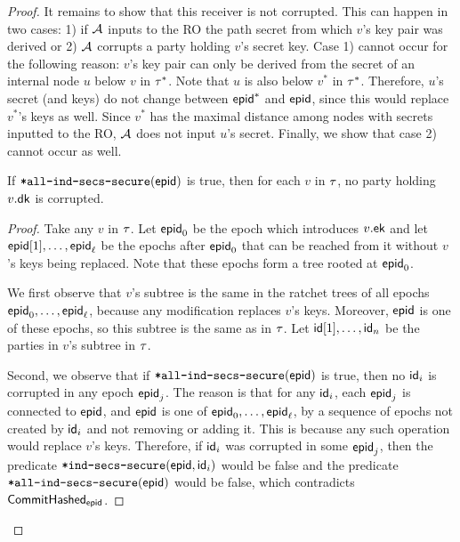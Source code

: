 \begin{proof}
It remains to show that this receiver is not corrupted. This can happen in two cases: 1) if $\mathcal{A}_{\relax}$ inputs to the RO the path secret from which $v$'s key pair was derived or 2) $\mathcal{A}_{\relax}$ corrupts a party holding $v$'s secret key. Case 1) cannot occur for the following reason: $v$'s key pair can only be derived from the secret of an internal node $u$ below $v$ in $\tau^*$. Note that $u$ is also below $v^*$ in $\tau^*$. Therefore, $u$'s secret (and keys) do not change between ${\normalfont\textsf{epid}}^*$ and ${\normalfont\textsf{epid}}$, since this would replace $v^*$'s keys as well. Since $v^*$ has the maximal distance among nodes with secrets inputted to the RO, $\mathcal{A}_{\relax}$ does not input $u$'s secret.
Finally, we show that case 2) cannot occur as well.
\begin{lemma}
  If ${\textnormal{\tt*all-ind-secs-secure}}({\normalfont\textsf{epid}})$ is true, then for each $v$ in $\tau$, no party holding $v.{\mathsf{dk}}$ is corrupted.
\end{lemma}
\begin{proof}
  Take any $v$ in $\tau$. Let ${\normalfont\textsf{epid}}_0$ be the epoch which introduces $v.{\mathsf{ek}}$ and let ${\normalfont\textsf{epid}}[1], \dots, {\normalfont\textsf{epid}}_\ell$ be the epochs after ${\normalfont\textsf{epid}}_0$ that can be reached from it without $v$'s keys being replaced. Note that these epochs form a tree rooted at ${\normalfont\textsf{epid}}_0$.

  We first observe that $v$'s subtree is the same in the ratchet trees of all epochs ${\normalfont\textsf{epid}}_0, \dots, {\normalfont\textsf{epid}}_\ell$, because any modification replaces $v$'s keys. Moreover, ${\normalfont\textsf{epid}}$ is one of these epochs, so this subtree is the same as in $\tau$. Let ${\mathsf{id}}[1], \dots, {\mathsf{id}}_n$ be the parties in $v$'s subtree in $\tau$.

  Second, we observe that if ${\textnormal{\tt*all-ind-secs-secure}}({\normalfont\textsf{epid}})$ is true, then no ${\mathsf{id}}_i$ is corrupted in any epoch ${\normalfont\textsf{epid}}_j$. The reason is that for any ${\mathsf{id}}_i$, each ${\normalfont\textsf{epid}}_j$ is connected to ${\normalfont\textsf{epid}}$, and ${\normalfont\textsf{epid}}$ is one of ${\normalfont\textsf{epid}}_0, \dots, {\normalfont\textsf{epid}}_\ell$, by a sequence of epochs not created by ${\mathsf{id}}_i$ and not removing or adding it. This is because any such operation would replace $v$'s keys. Therefore, if ${\mathsf{id}}_i$ was corrupted in some ${\normalfont\textsf{epid}}_j$, then the predicate ${\textnormal{\tt*ind-secs-secure}}({\normalfont\textsf{epid}}, {\mathsf{id}}_i)$ would be false and the predicate ${\textnormal{\tt*all-ind-secs-secure}}({\normalfont\textsf{epid}})$ would be false, which contradicts $\textnormal{\textsf{CommitHashed}}_{\normalfont\textsf{epid}}$.


\end{proof}
\end{proof}
